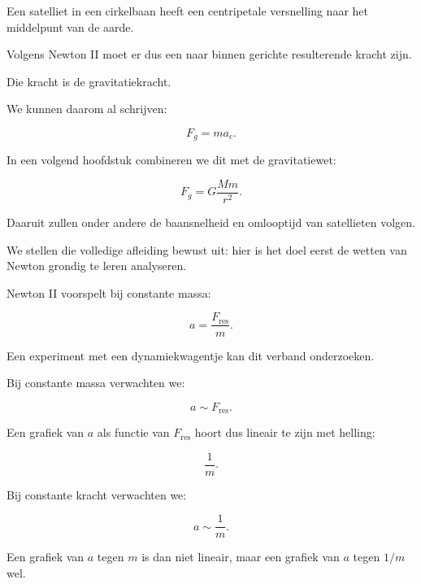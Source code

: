 \documentclass{ximera}
\begin{document}


Een satelliet in een cirkelbaan heeft een centripetale versnelling naar
het middelpunt van de aarde.

Volgens Newton II moet er dus een naar binnen gerichte resulterende
kracht zijn.

Die kracht is de gravitatiekracht.

We kunnen daarom al schrijven:

\[
\boxed{
F_g=ma_c.
}
\]

In een volgend hoofdstuk combineren we dit met de gravitatiewet:

\[
F_g=G\frac{Mm}{r^2}.
\]

Daaruit zullen onder andere de baansnelheid en omlooptijd van
satellieten volgen.

We stellen die volledige afleiding bewust uit: hier is het doel eerst
de wetten van Newton grondig te leren analyseren.




Newton II voorspelt bij constante massa:

\[
a=\frac{F_{\mathrm{res}}}{m}.
\]

Een experiment met een dynamiekwagentje kan dit verband onderzoeken.

Bij constante massa verwachten we:

\[
\boxed{
a\sim F_{\mathrm{res}}.
}
\]

Een grafiek van $a$ als functie van $F_{\mathrm{res}}$ hoort dus
lineair te zijn met helling:

\[
\frac1m.
\]

Bij constante kracht verwachten we:

\[
a\sim\frac1m.
\]

Een grafiek van $a$ tegen $m$ is dan niet lineair, maar een grafiek van
$a$ tegen $1/m$ wel.
\end{document}

